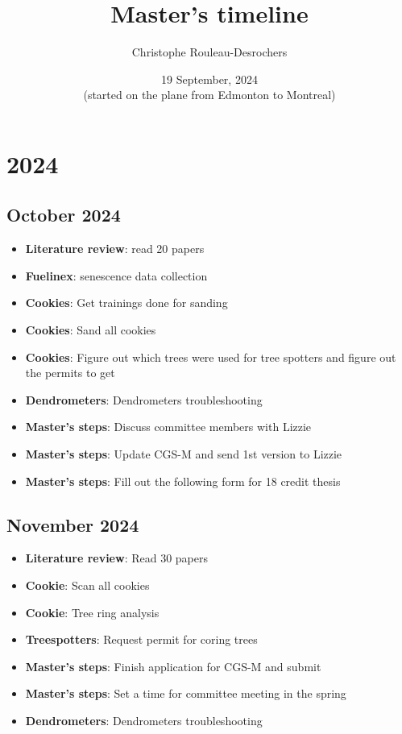 \documentclass{article}
\title{Master's timeline}
\author[]{Christophe Rouleau-Desrochers}
\date{19 September, 2024 \\ (started on the plane from Edmonton to Montreal)}
\begin{document}
\maketitle

\tableofcontents
\newpage


\section*{\centering \Large 2024}

\subsection*{October 2024}
\begin {itemize}
	\item \textbf{Literature review}: read 20 papers
	\item \textbf{Fuelinex}: senescence data collection
	\item \textbf{Cookies}: Get trainings done for sanding 
	\item \textbf{Cookies}: Sand all cookies
	\item \textbf{Cookies}: Figure out which trees were used for tree spotters and figure out the permits to get
	\item \textbf{Dendrometers}: Dendrometers troubleshooting
	\item \textbf{Master's steps}: Discuss committee members with Lizzie 
	\item \textbf{Master's steps}: Update CGS-M and send 1st version to Lizzie
	\item \textbf{Master's steps}: Fill out the following form for 18 credit thesis %
\end {itemize}


\subsection*{November 2024}
\begin{itemize}
    \item \textbf{Literature review}: Read 30 papers
    \item \textbf{Cookie}: Scan all cookies
    \item \textbf{Cookie}: Tree ring analysis
    \item \textbf{Treespotters}: Request permit for coring trees 
    \item \textbf{Master's steps}: Finish application for CGS-M and submit
    \item \textbf{Master's steps}: Set a time for committee meeting in the spring
    \item \textbf{Dendrometers}: Dendrometers troubleshooting
\end{itemize}
\end{document}
